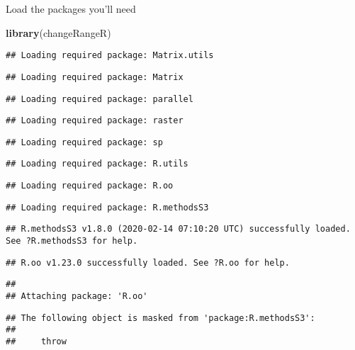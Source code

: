 \documentclass[
]{article}
\newenvironment{Shaded}{\begin{snugshade}}{\end{snugshade}}
\newcommand{\KeywordTok}[1]{\textcolor[rgb]{0.13,0.29,0.53}{\textbf{#1}}}
\newcommand{\NormalTok}[1]{#1}
\begin{document}
Load the packages you'll need

\begin{Shaded}
\begin{Highlighting}[]
\KeywordTok{library}\NormalTok{(changeRangeR)}
\end{Highlighting}
\end{Shaded}

\begin{verbatim}
## Loading required package: Matrix.utils
\end{verbatim}

\begin{verbatim}
## Loading required package: Matrix
\end{verbatim}

\begin{verbatim}
## Loading required package: parallel
\end{verbatim}

\begin{verbatim}
## Loading required package: raster
\end{verbatim}

\begin{verbatim}
## Loading required package: sp
\end{verbatim}

\begin{verbatim}
## Loading required package: R.utils
\end{verbatim}

\begin{verbatim}
## Loading required package: R.oo
\end{verbatim}

\begin{verbatim}
## Loading required package: R.methodsS3
\end{verbatim}

\begin{verbatim}
## R.methodsS3 v1.8.0 (2020-02-14 07:10:20 UTC) successfully loaded. See ?R.methodsS3 for help.
\end{verbatim}

\begin{verbatim}
## R.oo v1.23.0 successfully loaded. See ?R.oo for help.
\end{verbatim}

\begin{verbatim}
## 
## Attaching package: 'R.oo'
\end{verbatim}

\begin{verbatim}
## The following object is masked from 'package:R.methodsS3':
## 
##     throw
\end{verbatim}
\end{document}
